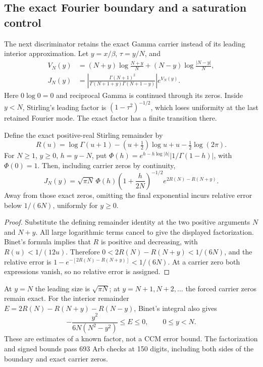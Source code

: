\subsection{The exact Fourier boundary and a saturation control}
\label{sec:discrete-amplitude-control}

The next discriminator retains the exact Gamma carrier instead of its
leading interior approximation. Let $y=x/\beta$, $\tau=y/N$, and
\begin{align*}
 V_N(y)&=(N+y)\log\frac{N+y}{N}
            +(N-y)\log\frac{|N-y|}{N},\\
 J_N(y)&=\left|\frac{\Gamma(N+1)^2}
 {\Gamma(N+1+y)\Gamma(N+1-y)}\right|e^{V_N(y)}.
\end{align*}
Here $0\log0=0$ and reciprocal Gamma is continued through its zeros.
Inside $y<N$, Stirling's leading factor is $(1-\tau^2)^{-1/2}$,
which loses uniformity at the last retained Fourier mode. The exact
factor has a finite transition there.

\begin{proposition}
\label{prop:uniform-carrier-factor}
Define the exact positive-real Stirling remainder by
\[
 R(u)=\log\Gamma(u+1)-(u+\tfrac12)\log u+u-\tfrac12\log(2\pi).
\]
For $N\geq1$, $y\geq0$, $h=y-N$, put
$\Phi(h)=e^{h-h\log|h|}|1/\Gamma(1-h)|$, with $\Phi(0)=1$.
Then, including carrier zeros by continuity,
\[
 J_N(y)=\sqrt{\pi N}\,\Phi(h)
       \left(1+\frac{h}{2N}\right)^{-1/2}
       e^{2R(N)-R(N+y)}.
\]
Away from those exact zeros, omitting the final exponential incurs
relative error below $1/(6N)$, uniformly for $y\geq0$.
\end{proposition}
\begin{proof}
Substitute the defining remainder identity at the two positive arguments
$N$ and $N+y$. All large logarithmic terms cancel to give the displayed
factorization. Binet's formula\cite{DLMFGamma} implies that $R$ is positive and decreasing,
with $R(u)<1/(12u)$. Therefore
$0<2R(N)-R(N+y)<1/(6N)$, and the relative error is
$1-e^{-[2R(N)-R(N+y)]}<1/(6N)$. At a carrier zero both expressions
vanish, so no relative error is assigned.
\end{proof}
At $y=N$ the leading size is $\sqrt{\pi N}$; at
$y=N+1,N+2,\ldots$ the forced carrier zeros remain exact.
For the interior remainder
$E=2R(N)-R(N+y)-R(N-y)$, Binet's integral also gives
\[
 -\frac{y^2}{6N(N^2-y^2)}\leq E\leq0,\qquad 0\leq y<N.
\]
These are estimates of a known factor, not a CCM error bound. The
factorization and signed bounds pass 693 Arb checks at 150 digits,
including both sides of the boundary and exact carrier zeros.

